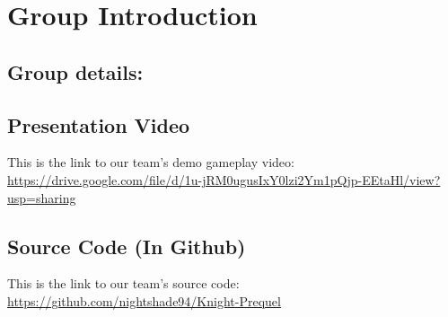 \section*{Group Introduction}

\subsection*{Group details:}
\begin{center}
	\begin{table}[H]
		\renewcommand{\arraystretch}{1.5}
		\setlength{\tabcolsep}{8pt} %
		\caption{Group details}
	\end{table}
\end{center}

\subsection*{Presentation Video}
This is the link to our team's demo gameplay video: \newline
\href{https://drive.google.com/file/d/1u-jRM0ugusIxY0lzi2Ym1pQjp-EEtaHl/view?usp=sharing}{https://drive.google.com/file/d/1u-jRM0ugusIxY0lzi2Ym1pQjp-EEtaHl/view?usp=sharing}  

\subsection*{Source Code (In Github)} 
This is the link to our team's source code: 
\href{https://github.com/nightshade94/Knight-Prequel}{https://github.com/nightshade94/Knight-Prequel}


